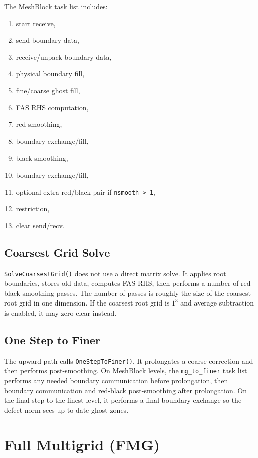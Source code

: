 \documentclass[11pt]{article}
\newcommand{\code}[1]{\texttt{#1}}
\begin{document}
The MeshBlock task list includes:
\begin{enumerate}
  \item start receive,
  \item send boundary data,
  \item receive/unpack boundary data,
  \item physical boundary fill,
  \item fine/coarse ghost fill,
  \item FAS RHS computation,
  \item red smoothing,
  \item boundary exchange/fill,
  \item black smoothing,
  \item boundary exchange/fill,
  \item optional extra red/black pair if \code{nsmooth > 1},
  \item restriction,
  \item clear send/recv.
\end{enumerate}

\subsection{Coarsest Grid Solve}

\code{SolveCoarsestGrid()} does not use a direct matrix solve.  It applies root
boundaries, stores old data, computes FAS RHS, then performs a number of
red-black smoothing passes.  The number of passes is roughly the size of the
coarsest root grid in one dimension.  If the coarsest root grid is \(1^3\) and
average subtraction is enabled, it may zero-clear instead.

\subsection{One Step to Finer}

The upward path calls \code{OneStepToFiner()}.  It prolongates a coarse
correction and then performs post-smoothing.  On MeshBlock levels, the
\code{mg\_to\_finer} task list performs any needed boundary communication before
prolongation, then boundary communication and red-black post-smoothing after
prolongation.  On the final step to the finest level, it performs a final
boundary exchange so the defect norm sees up-to-date ghost zones.

\section{Full Multigrid (FMG)}
\end{document}
